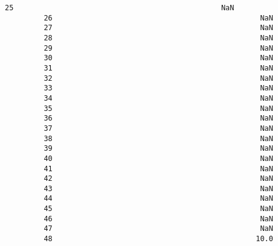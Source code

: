 \documentclass[11pt]{article}
\begin{document}
\begin{Verbatim}[commandchars=\\\{\}]
         25                                                NaN                                     
         26                                                NaN                                     
         27                                                NaN                                     
         28                                                NaN                                     
         29                                                NaN                                     
         30                                                NaN                                     
         31                                                NaN                                     
         32                                                NaN                                     
         33                                                NaN                                     
         34                                                NaN                                     
         35                                                NaN                                     
         36                                                NaN                                     
         37                                                NaN                                     
         38                                                NaN                                     
         39                                                NaN                                     
         40                                                NaN                                     
         41                                                NaN                                     
         42                                                NaN                                     
         43                                                NaN                                     
         44                                                NaN                                     
         45                                                NaN                                     
         46                                                NaN                                     
         47                                                NaN                                     
         48                                               10.0                                     
         

\end{Verbatim}
\end{document}
